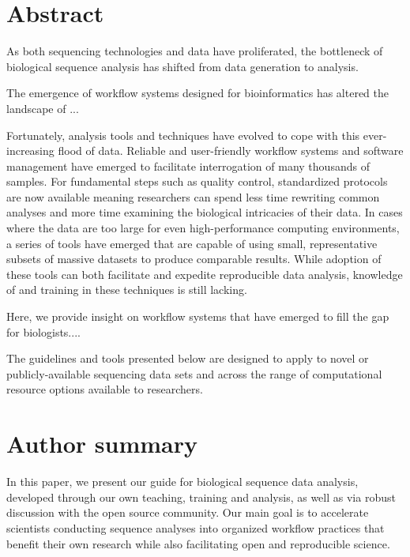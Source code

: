 \documentclass[10pt,letterpaper]{article}
\begin{document}
\section*{Abstract} 
As both sequencing technologies and data have proliferated, the bottleneck of biological sequence analysis has shifted from data generation to analysis. 


The emergence of workflow systems designed for bioinformatics has altered the landscape of ...

Fortunately, analysis tools and techniques have evolved to cope with this ever-increasing flood of data. 
Reliable and user-friendly workflow systems and software management have emerged to facilitate interrogation of many thousands of samples. 
For fundamental steps such as quality control, standardized protocols are now available meaning researchers can spend less time rewriting common analyses and more time examining the biological intricacies of their data. 
In cases where the data are too large for even high-performance computing environments, a series of tools have emerged that are capable of using small, representative subsets of massive datasets to produce comparable results. 
While adoption of these tools can both facilitate and expedite reproducible data analysis, knowledge of and training in these techniques is still lacking. 

Here, we provide insight on workflow systems that have emerged to fill the gap for biologists....

The guidelines and tools presented below are designed to apply to novel or publicly-available sequencing data sets and across the range of computational resource options available to researchers.



{\section*{Author summary}
In this paper, we present our guide for biological sequence data analysis, developed through our own teaching, training and analysis, as well as via robust discussion with  the open source community. %
Our main goal is to accelerate scientists conducting sequence analyses into organized workflow practices that benefit their own research while also facilitating open and reproducible science.
}
\end{document}
